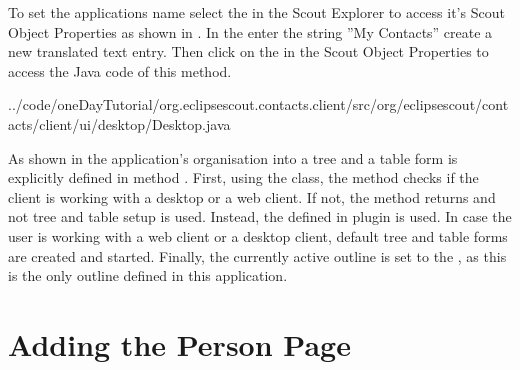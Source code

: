 \documentclass[a4paper,10pt,twoside]{book}
\begin{document}
To set the applications name select the  in the Scout Explorer to access it's Scout Object Properties as shown in .
In the  enter the string ''My Contacts'' create a new translated text entry. 
Then click on the  in the Scout Object Properties to access the Java code of this method. 


{../code/oneDayTutorial/org.eclipsescout.contacts.client/src/org/eclipsescout/contacts/client/ui/desktop/Desktop.java}

As shown in  the application's organisation into a tree and a table form is explicitly defined in method . 
First, using the  class, the method checks if the client is working with a desktop or a web client. 
If not, the method returns and not tree and table setup is used. 
Instead, the  defined in plugin  is used. 
In case the user is working with a web client or a desktop client, default tree and table forms are created and started. 
Finally, the currently active outline is set to the , as this is the only outline defined in this application.

\section{Adding the Person Page}
\end{document}
